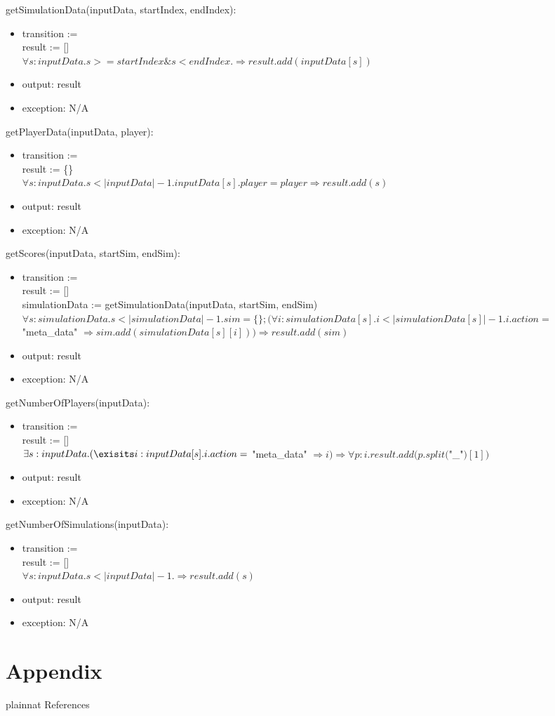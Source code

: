 \documentclass[12pt, titlepage]{article}
\begin{document}
\noindent getSimulationData(inputData, startIndex, endIndex):
\begin{itemize}
\item transition := \\
result := []\\
$\forall s: inputData. s >= startIndex \& s < endIndex. \Rightarrow 
result.add(inputData[s])$
\item output: result
\item exception: N/A
\end{itemize}

\noindent getPlayerData(inputData, player):
\begin{itemize}
\item transition := \\
result := \{\}\\
$\forall s: inputData. s < |inputData| - 1 . inputData[s].player = player \Rightarrow 
result.add(s)$
\item output: result
\item exception: N/A
\end{itemize}

\noindent getScores(inputData, startSim, endSim):
\begin{itemize}
\item transition := \\
result := []\\
simulationData := getSimulationData(inputData, startSim, endSim)\\
$\forall s: simulationData. s < |simulationData|-1. sim = \{\}; (\forall i: simulationData[s]. i < |simulationData[s]|-1. i.action = $ "meta\_data" $\Rightarrow sim.add(simulationData[s][i])) \Rightarrow result.add(sim)$
\item output: result
\item exception: N/A
\end{itemize}

\noindent getNumberOfPlayers(inputData):
\begin{itemize}
\item transition := \\
result := []\\
$\exists s: inputData. (\exisits i: inputData[s]. i.action = $ "meta\_data" $\Rightarrow i) \Rightarrow \forall p: i. result.add(p.split($"\_"$)[1])$
\item output: result
\item exception: N/A
\end{itemize}

\noindent getNumberOfSimulations(inputData):
\begin{itemize}
\item transition := \\
result := []\\
$\forall s: inputData. s < |inputData|-1.  \Rightarrow result.add(s)$
\item output: result
\item exception: N/A
\end{itemize}

\section{Appendix} \label{Appendix}

 {plainnat}
 {References}
\end{document}
